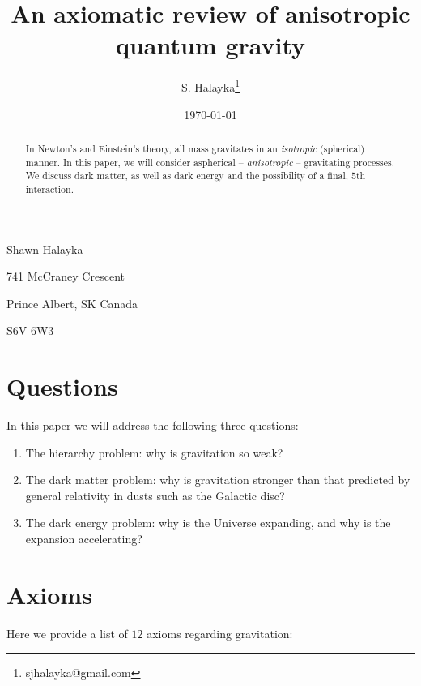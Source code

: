 \documentclass[12pt]{article}
\title{An axiomatic review of anisotropic quantum gravity}
\author{S. Halayka\footnote{sjhalayka@gmail.com}}
\date{\today\;\currenttime}
\begin{document}
 
\maketitle



Shawn Halayka

741 McCraney Crescent

Prince Albert, SK Canada

S6V 6W3



\begin{abstract}
In Newton's and Einstein's theory, all mass gravitates in an {\textit{isotropic}} (spherical) manner.
In this paper, we will consider aspherical -- {\textit{anisotropic}} -- gravitating processes.
We discuss dark matter, as well as dark energy and the possibility of a final, $5$th interaction.
\end{abstract}


\section{Questions}

In this paper we will address the following three questions:
\begin{enumerate}
\item The hierarchy problem: why is gravitation so weak?
\item The dark matter problem: why is gravitation stronger than that predicted by general relativity in dusts such as the Galactic disc?
\item The dark energy problem: why is the Universe expanding, and why is the expansion accelerating?
\end{enumerate}






\section{Axioms}

Here we provide a list of $12$ axioms regarding gravitation:
\end{document}
